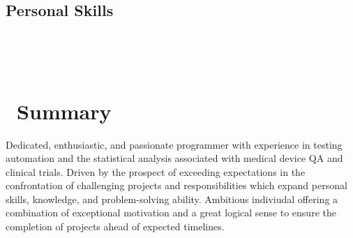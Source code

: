 \documentclass[]{moak-resume}
\begin{document}
\begin{aside}
  \section{Personal Skills}
    ~
\end{aside}
~
\section{ \newline Summary}
\begin{entrylist}
	\entry
	{}
	{}
	{}
	{Dedicated, enthusiastic, and passionate programmer with experience in testing automation and the statistical analysis associated with medical device QA and clinical trials.  Driven by the prospect of exceeding expectations in the confrontation of challenging projects and responsibilities which expand personal skills, knowledge, and problem-solving ability.  Ambitious indiviudal offering a combination of exceptional motivation and a great logical sense to ensure the completion of projects ahead of expected timelines.\\}
\end{entrylist}
\\
\end{document}
